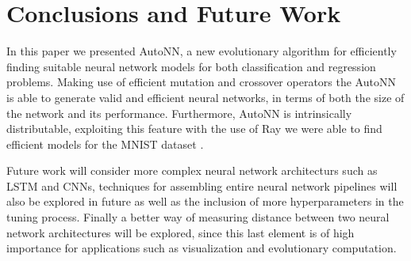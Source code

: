 \documentclass[journal]{IEEEtran}
\begin{document}
\section{Conclusions and Future Work}
\label{sec:conclusions}

In this paper we presented AutoNN, a new evolutionary algorithm for efficiently finding suitable neural network models for both classification and regression problems. Making use of efficient mutation and crossover operators the AutoNN is able to generate valid and efficient neural networks, in terms of both the size of the network and its performance. Furthermore, AutoNN is intrinsically distributable, exploiting this feature with the use of Ray \cite{Moritz2017} we were able to find efficient models for the MNIST dataset \cite{Lecun2010}.

Future work will consider more complex neural network architecturs such as LSTM and CNNs, techniques for assembling entire neural network pipelines will also be explored in future as well as the inclusion of more hyperparameters in the tuning process. Finally a better way of measuring distance between two neural network architectures will be explored, since this last element is of high importance for applications such as visualization and evolutionary computation.

\end{document}
